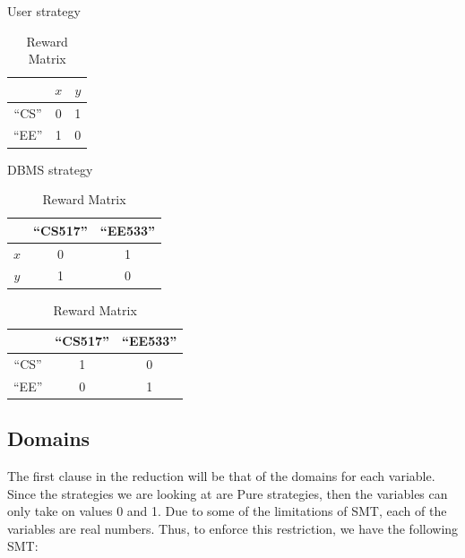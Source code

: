 \documentclass{article}
\begin{document}
\begin{table}[h!]
	\centering
    \begin{minipage}{.2\linewidth}
        \caption{User strategy}
        \centering
        \begin{tabular}{c|c|c|}
            \cline{2-3}
             & \multicolumn{1}{c|}{$x$} & $y$\\
            \hline
            \multicolumn{1}{|c|}{``CS''} & 0 & 1\\
            \hline
            \multicolumn{1}{|c|}{``EE''} & 1 & 0\\
            \hline
        \end{tabular}
        \label{example:framework:table:strategies:sender}
    \end{minipage}
    \begin{minipage}{.35\linewidth}
        \caption{DBMS strategy}
        \centering
        \begin{tabular}{c|c|c|}
            \cline{2-3}
             & \multicolumn{1}{c|}{``CS517''} & ``EE533''\\
            \hline
            \multicolumn{1}{|c|}{$x$} & 0 & 1\\
            \hline
            \multicolumn{1}{|c|}{$y$} & 1 & 0\\
            \hline
        \end{tabular}
        \label{example:framework:table:strategies:receiver}
    \end{minipage}
       \begin{minipage}{.3\linewidth}
        \caption{Reward Matrix}
        \centering
        \begin{tabular}{c|c|c|}
            \cline{2-3}
             & \multicolumn{1}{c|}{``CS517''} & ``EE533''\\
            \hline
            \multicolumn{1}{|c|}{``CS''} & 1 & 0\\
            \hline
            \multicolumn{1}{|c|}{``EE''} & 0 & 1\\
            \hline
        \end{tabular}
        \label{example:framework:table:strategies:reward}
    \end{minipage}
\end{table}

\subsection{Domains}
The first clause in the reduction will be that of the domains for each variable. Since the strategies we are looking at are Pure strategies, then the variables can only take on values 0 and 1. Due to some of the limitations of SMT, each of the variables are real numbers. Thus, to enforce this restriction, we have the following SMT:
\end{document}
